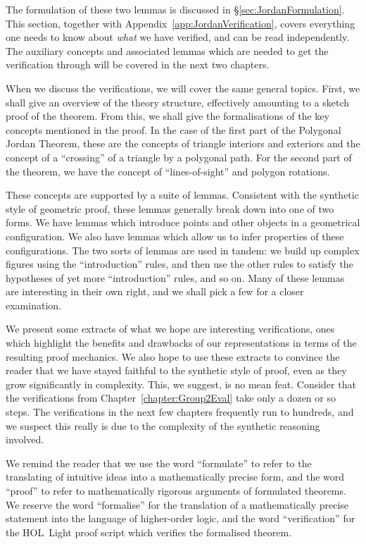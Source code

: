 The formulation of these two lemmas is discussed in \S\ref{sec:JordanFormulation}. This section, together with Appendix~\ref{app:JordanVerification}, covers everything one needs to know about \emph{what} we have verified, and can be read independently. The auxiliary concepts and associated lemmas which are needed to get the verification through will be covered in the next two chapters.

When we discuss the verifications, we will cover the same general topics. First, we shall give an overview of the theory structure, effectively amounting to a sketch proof of the theorem. From this, we shall give the formalisations of the key concepts mentioned in the proof. In the case of the first part of the Polygonal Jordan Theorem, these are the concepts of triangle interiors and exteriors and the concept of a ``crossing'' of a triangle by a polygonal path. For the second part of the theorem, we have the concept of ``lines-of-sight'' and polygon rotations. 

These concepts are supported by a suite of lemmas. Consistent with the synthetic style of geometric proof, these lemmas generally break down into one of two forms. We have lemmas which introduce points and other objects in a geometrical configuration. We also have lemmas which allow us to infer properties of these configurations. The two sorts of lemmas are used in tandem: we build up complex figures using the ``introduction'' rules, and then use the other rules to satisfy the hypotheses of yet more ``introduction'' rules, and so on. Many of these lemmas are interesting in their own right, and we shall pick a few for a closer examination.

We present some extracts of what we hope are interesting verifications, ones which highlight the benefits and drawbacks of our representations in terms of the resulting proof mechanics. We also hope to use these extracts to convince the reader that we have stayed faithful to the synthetic style of proof, even as they grow significantly in complexity. This, we suggest, is no mean feat. Consider that the verifications from Chapter~\ref{chapter:Group2Eval} take only a dozen or so steps. The verifications in the next few chapters frequently run to hundreds, and we suspect this really is due to the complexity of the synthetic reasoning involved.

We remind the reader that we use the word ``formulate'' to refer to the translating of intuitive ideas into a mathematically precise form, and the word ``proof'' to refer to mathematically rigorous arguments of formulated theorems. We reserve the word ``formalise'' for the translation of a mathematically precise statement into the language of higher-order logic, and the word ``verification'' for the HOL~Light proof script which verifies the formalised theorem.

